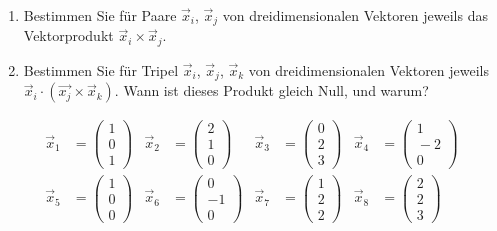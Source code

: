 \documentclass[11pt]{exam}
\begin{document}
\begin{questions}
\begin{enumerate}
	\item Bestimmen Sie für Paare $\vec{x}_i$, $\vec{x}_j$ von dreidimensionalen Vektoren jeweils das Vektorprodukt $\vec{x}_i\times\vec{x}_j$.
	\item Bestimmen Sie für Tripel $\vec{x}_i$, $\vec{x}_j$, $\vec{x}_k$ von dreidimensionalen Vektoren jeweils $\vec{x}_i\cdot(\vec{x_j}\times\vec{x}_k)$. Wann ist dieses Produkt gleich Null, und warum?
\end{enumerate}
\begin{align*}
	\vec{x}_1&=\left(\begin{array}{c}1\\0\\1\end{array}\right)
	&\vec{x}_2&=\left(\begin{array}{c}2\\1\\0\end{array}\right)
	&\vec{x}_3&=\left(\begin{array}{c}0\\2\\3\end{array}\right)
	&\vec{x}_4&=\left(\begin{array}{c}1\\{}-2\\0\end{array}\right)\\
	\vec{x}_5&=\left(\begin{array}{c}1\\0\\0\end{array}\right)
	&\vec{x}_6&=\left(\begin{array}{c}0\\-1\\0\end{array}\right)
	&\vec{x}_7&=\left(\begin{array}{c}1\\2\\2\end{array}\right)
	&\vec{x}_8&=\left(\begin{array}{c}2\\2\\3\end{array}\right)\\
\end{align*}


\end{questions}
\end{document}
